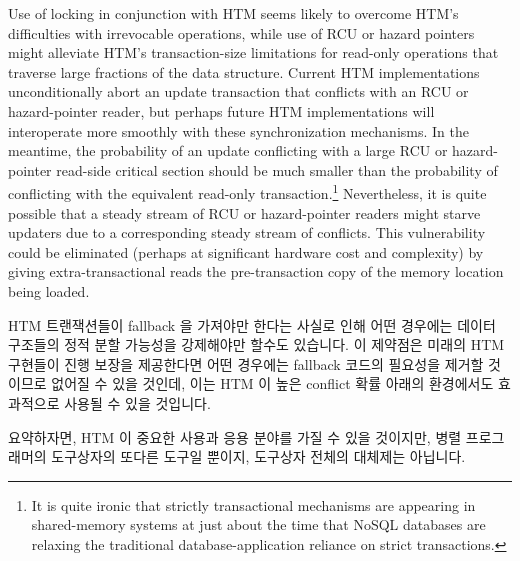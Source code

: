 Use of locking in conjunction with HTM seems likely to overcome HTM's
difficulties with irrevocable operations, while use of RCU or
hazard pointers might alleviate HTM's transaction-size limitations
for read-only operations that traverse large fractions of the data
structure.
Current HTM implementations unconditionally abort an update transaction
that conflicts with an RCU or hazard-pointer reader, but perhaps future
HTM implementations will interoperate more smoothly with these
synchronization mechanisms.
In the meantime, the probability of an update conflicting with a
large RCU or hazard-pointer read-side critical section should be
much smaller than the probability of conflicting with the equivalent
read-only transaction.\footnote{
	It is quite ironic that strictly transactional mechanisms are
	appearing in shared-memory systems at just about the time
	that NoSQL databases are relaxing the traditional
	database-application reliance on strict transactions.}
Nevertheless, it is quite possible that a steady stream of RCU or
hazard-pointer readers might starve updaters due to a corresponding
steady stream of conflicts.
This vulnerability could be eliminated (perhaps at significant
hardware cost and complexity) by giving extra-transactional
reads the pre-transaction copy of the memory location being loaded.
\fi

HTM 트랜잭션들이 fallback 을 가져야만 한다는 사실로 인해 어떤 경우에는 데이터
구조들의 정적 분할 가능성을 강제해야만 할수도 있습니다.
이 제약점은 미래의 HTM 구현들이 진행 보장을 제공한다면 어떤 경우에는 fallback
코드의 필요성을 제거할 것이므로 없어질 수 있을 것인데, 이는 HTM 이 높은
conflict 확률 아래의 환경에서도 효과적으로 사용될 수 있을 것입니다.

요약하자면, HTM 이 중요한 사용과 응용 분야를 가질 수 있을 것이지만, 병렬
프로그래머의 도구상자의 또다른 도구일 뿐이지, 도구상자 전체의 대체제는
아닙니다.
\iffalse

The fact that HTM transactions must have fallbacks might in some cases
force static partitionability of data structures back onto HTM.
This limitation might be alleviated if future HTM implementations
provide forward-progress guarantees, which might eliminate the need
for fallback code in some cases, which in turn might allow HTM to
be used efficiently in situations with higher conflict probabilities.

In short, although HTM is likely to have important uses and applications,
it is another tool in the parallel programmer's toolbox, not a replacement
for the toolbox in its entirety.
\fi

